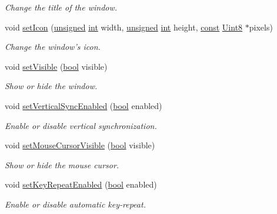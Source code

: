 \begin{DoxyCompactItemize}
\begin{DoxyCompactList}\small\item\em Change the title of the window. \end{DoxyCompactList}\item 
void \hyperlink{classsf_1_1_window_a63af61e026fba08e3153fd013620bcc0}{set\-Icon} (\hyperlink{curses_8priv_8h_aca40206900cfc164654362fa8d4ad1e6}{unsigned} \hyperlink{term__entry_8h_ad65b480f8c8270356b45a9890f6499ae}{int} width, \hyperlink{curses_8priv_8h_aca40206900cfc164654362fa8d4ad1e6}{unsigned} \hyperlink{term__entry_8h_ad65b480f8c8270356b45a9890f6499ae}{int} height, \hyperlink{term__entry_8h_a57bd63ce7f9a353488880e3de6692d5a}{const} \hyperlink{namespacesf_a4ef3d630785c4f296f9b4f274c33d78e}{Uint8} $\ast$pixels)
\begin{DoxyCompactList}\small\item\em Change the window's icon. \end{DoxyCompactList}\item 
void \hyperlink{classsf_1_1_window_a160f7f11a207603d7e99ce606e749703}{set\-Visible} (\hyperlink{term__entry_8h_a002004ba5d663f149f6c38064926abac}{bool} visible)
\begin{DoxyCompactList}\small\item\em Show or hide the window. \end{DoxyCompactList}\item 
void \hyperlink{classsf_1_1_window_a59041c4556e0351048f8aff366034f61}{set\-Vertical\-Sync\-Enabled} (\hyperlink{term__entry_8h_a002004ba5d663f149f6c38064926abac}{bool} enabled)
\begin{DoxyCompactList}\small\item\em Enable or disable vertical synchronization. \end{DoxyCompactList}\item 
void \hyperlink{classsf_1_1_window_aad3991c25e0a83afbb4d62febf9b7b14}{set\-Mouse\-Cursor\-Visible} (\hyperlink{term__entry_8h_a002004ba5d663f149f6c38064926abac}{bool} visible)
\begin{DoxyCompactList}\small\item\em Show or hide the mouse cursor. \end{DoxyCompactList}\item 
void \hyperlink{classsf_1_1_window_aef9f2b14c10ecba8a8df95dd51c5bb73}{set\-Key\-Repeat\-Enabled} (\hyperlink{term__entry_8h_a002004ba5d663f149f6c38064926abac}{bool} enabled)
\begin{DoxyCompactList}\small\item\em Enable or disable automatic key-\/repeat. \end{DoxyCompactList}\item 

\end{DoxyCompactItemize}
